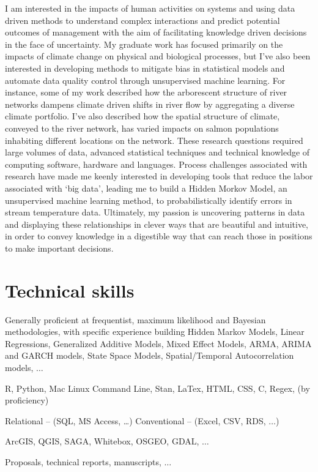 I am interested in the impacts of human activities on systems and using data driven methods to understand complex interactions and predict potential outcomes of management with the aim of facilitating knowledge driven decisions in the face of uncertainty. My graduate work has focused primarily on the impacts of climate change on physical and biological processes, but I’ve also been interested in developing methods to mitigate bias in statistical models and automate data quality control through unsupervised machine learning. For instance, some of my work described how the arborescent structure of river networks dampens climate driven shifts in river flow by aggregating a diverse climate portfolio. I’ve also described how the spatial structure of climate, conveyed to the river network, has varied impacts on salmon populations inhabiting different locations on the network. These research questions required large volumes of data, advanced statistical techniques and technical knowledge of computing software, hardware and languages. Process challenges associated with research have made me keenly interested in developing tools that reduce the labor associated with ‘big data’, leading me to build a Hidden Morkov Model, an unsupervised machine learning method, to probabilistically identify errors in stream temperature data. Ultimately, my passion is uncovering patterns in data and displaying these relationships in clever ways that are beautiful and intuitive, in order to convey knowledge in a digestible way that can reach those in positions to make important decisions.



\section{Technical skills}

\begin{description}
\tightlist
\item[Stats] Generally proficient at frequentist, maximum likelihood and Bayesian methodologies, with specific experience building Hidden Markov Models, Linear Regressions, Generalized Additive Models, Mixed Effect Models, ARMA, ARIMA and GARCH models, State Space Models, Spatial/Temporal Autocorrelation models, $\dots$\\
\item[Langs] R, Python, Mac Linux Command Line, Stan, LaTex, HTML, CSS, C, Regex, (by proficiency)\\
\item[DB Mgt] Relational – (SQL, MS Access, …) Conventional – (Excel, CSV, RDS, $\dots$)\\
\item[GIS] ArcGIS, QGIS, SAGA, Whitebox, OSGEO, GDAL, $\dots$\\
\item[Writing] Proposals, technical reports, manuscripts, $\dots$\\

\end{description}




